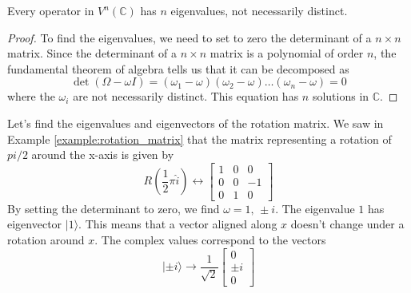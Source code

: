\documentclass[11pt,fleqn]{book} %
\newcommand{\ket}[1]{| #1\rangle}
\begin{document}
\begin{theorem}
    Every operator in $V^n(\mathbb{C})$ has $n$ eigenvalues, not necessarily distinct.
\end{theorem}
\begin{proof}
    To find the eigenvalues, we need to set to zero the determinant of a $n\times n$ matrix. Since the determinant of a $n\times n$
    matrix is a polynomial of order $n$, the fundamental theorem of algebra tells us that it can be decomposed as 
    \begin{equation*}
        \det  \left(\Omega-\omega I\right) = (\omega_1-\omega)(\omega_2-\omega)\dots(\omega_n-\omega)=0
    \end{equation*}
    where the $\omega_i$ are not necessarily distinct. This equation has $n$ solutions in $\mathbb{C}$.
\end{proof}

\begin{example}
    Let's find the eigenvalues and eigenvectors of the rotation matrix. We saw in Example \ref{example:rotation_matrix} that the
    matrix representing a rotation of $pi/2$ around the x-axis is given by
    \begin{equation*}
        R\left(\frac{1}{2}\pi \hat i\right) \leftrightarrow \left[\begin{array}{ccc}
            1&0&0\\
            0&0&-1\\
            0&1&0
        \end{array}\right]
    \end{equation*}
    By setting the determinant to zero, we find $\omega=1,\,\pm i$. The eigenvalue $1$ has eigenvector $\ket{1}$. This means that a 
    vector aligned along $x$ doesn't change under a rotation around $x$. The complex values correspond to the vectors 
    \begin{equation*}
        \ket{\pm i} \rightarrow \frac{1}{\sqrt{2}}\left[\begin{array}{c}
            0\\
            \pm i\\
            0
        \end{array}\right]
    \end{equation*}
\end{example}
\end{document}
